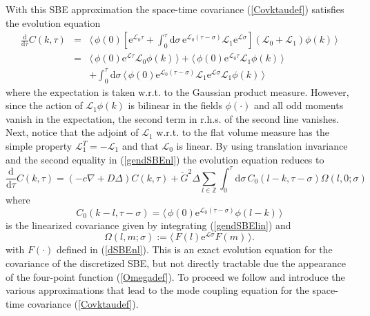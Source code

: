 \documentclass[12pt]{article}
\newcommand{\exval}[1]{\mbox{$\langle \, {#1}\, \rangle$}}
\newcommand{\rmd}{\mathrm{d}}
\newcommand{\rme}{\mathrm{e}}
\newcommand{\Z}{{\mathbb Z}}
\begin{document}
With this SBE approximation the space-time covariance 
(\ref{Covktaudef}) satisfies the evolution equation
\begin{eqnarray}
\frac{\rmd}{\rmd \tau} C(k,\tau) 
& = & \exval{\phi(0)
\left[
\rme^{\mathcal{L}_{0} \tau} + 
\int_{0}^{\tau} \rmd \sigma \, \rme^{\mathcal{L}_{0} (\tau - \sigma)} 
\mathcal{L}_{1} \rme^{\mathcal{L} \sigma}\right] (\mathcal{L}_{0}
+\mathcal{L}_{1}) \phi(k)} \\
& = & \exval{\phi(0)
\rme^{\mathcal{L} \tau} \mathcal{L}_{0} \phi(k)} 
+ \exval{\phi(0)\rme^{\mathcal{L}_{0} \tau} \mathcal{L}_{1} \phi(k)}\nonumber \\
& & + \int_{0}^{\tau} \rmd \sigma \, \exval{\phi(0)
\rme^{\mathcal{L}_{0} (\tau - \sigma)} \mathcal{L}_{1} 
\rme^{\mathcal{L}\sigma}\mathcal{L}_{1} \phi(k)}
\end{eqnarray}
where the expectation is taken w.r.t. to the Gaussian product measure.
However, since the action of $\mathcal{L}_{1} \phi(k)$ is bilinear
in the fields $\phi(\cdot)$ and all odd moments vanish in the expectation, the second
term in r.h.s. of the second line vanishes. Next, notice that
the adjoint of $\mathcal{L}_{1}$ w.r.t. to the flat volume measure 
has the simple property $\mathcal{L}^T_{1} = - \mathcal{L}_{1}$
and that $\mathcal{L}_{0}$ is linear. By using translation
invariance and the second equality in (\ref{gendSBEnl})
the evolution equation reduces to 
\begin{equation}
\frac{\rmd}{\rmd \tau} C(k,\tau) 
= \left(- c \nabla + 
D \Delta\right) C(k,\tau)
+  \check{G}^2 \Delta \sum_{l\in\Z} \int_{0}^{\tau} \rmd \sigma \,  
C_0(l-k,\tau-\sigma) \Omega(l,0;\sigma)
\label{apprx1}
\end{equation}
where 
\begin{equation}
C_0(k-l,\tau-\sigma) = \exval{\phi(0)
\rme^{\mathcal{L}_0 (\tau-\sigma)} \phi(l-k)}
\label{dSBElinprop}
\end{equation}
is the linearized covariance given by integrating 
(\ref{gendSBElin}) and  
\begin{equation}
\Omega(l,m;\sigma) := \exval{F(l)
\rme^{\mathcal{L}\sigma} F(m)}.
\label{Omegadef}
\end{equation}
with $F(\cdot)$ defined in (\ref{dSBEnl}). This is an exact evolution
equation for the covariance of the discretized SBE, but not directly
tractable due the appearance of the four-point function (\ref{Omegadef}).
To proceed we follow
\cite{vanB85,Spoh14} and introduce the
various approximations that lead to the mode coupling equation
for the space-time covariance (\ref{Covktaudef}).
\end{document}
